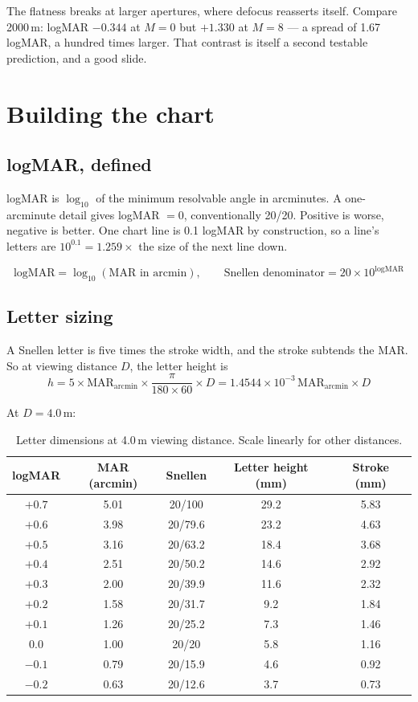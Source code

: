 \documentclass[11pt]{report}
\begin{document}
The flatness breaks at larger apertures, where defocus reasserts itself. Compare 2000\,\textmu m:
logMAR $-0.344$ at $M=0$ but $+1.330$ at $M=8$ --- a spread of 1.67 logMAR, a hundred times larger.
That contrast is itself a second testable prediction, and a good slide.

\chapter{Building the chart}

\section{logMAR, defined}

logMAR is $\log_{10}$ of the minimum resolvable angle in arcminutes. A one-arcminute detail gives
logMAR $=0$, conventionally 20/20. Positive is worse, negative is better. One chart line is 0.1
logMAR by construction, so a line's letters are $10^{0.1} = 1.259\times$ the size of the next line down.

\begin{equation}
\text{logMAR} = \log_{10}(\text{MAR in arcmin}), \qquad
\text{Snellen denominator} = 20 \times 10^{\text{logMAR}}
\end{equation}

\section{Letter sizing}

A Snellen letter is five times the stroke width, and the stroke subtends the MAR. So at viewing
distance $D$, the letter height is
\begin{equation}
h = 5 \times \text{MAR}_{\text{arcmin}} \times \frac{\pi}{180\times 60} \times D
= 1.4544\times10^{-3}\,\text{MAR}_{\text{arcmin}} \times D
\end{equation}

At $D = 4.0$\,m:

\begin{table}[h!]
\centering
\begin{tabular}{ccccc}
\toprule
logMAR & MAR (arcmin) & Snellen & Letter height (mm) & Stroke (mm) \\
\midrule
$+0.7$ & 5.01 & 20/100 & 29.2 & 5.83 \\
$+0.6$ & 3.98 & 20/79.6 & 23.2 & 4.63 \\
$+0.5$ & 3.16 & 20/63.2 & 18.4 & 3.68 \\
$+0.4$ & 2.51 & 20/50.2 & 14.6 & 2.92 \\
$+0.3$ & 2.00 & 20/39.9 & 11.6 & 2.32 \\
$+0.2$ & 1.58 & 20/31.7 & 9.2 & 1.84 \\
$+0.1$ & 1.26 & 20/25.2 & 7.3 & 1.46 \\
$0.0$ & 1.00 & 20/20 & 5.8 & 1.16 \\
$-0.1$ & 0.79 & 20/15.9 & 4.6 & 0.92 \\
$-0.2$ & 0.63 & 20/12.6 & 3.7 & 0.73 \\
\bottomrule
\end{tabular}
\caption{Letter dimensions at 4.0\,m viewing distance. Scale linearly for other distances.}
\end{table}
\end{document}
